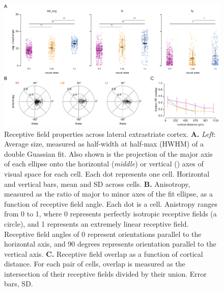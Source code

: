 
\begin{figure}[t!]
    \includegraphics[width=\textwidth]{figures/chapter_3/fig_3-4_rf_aggregate/fig_3-4_rf_aggregate.pdf}
    \vspace{.1in}
    \caption[Receptive field properties]{Receptive field properties across lateral extrastriate cortex. 
    \textbf{A.} \textit{Left}: Average size, measured as half-width at half-max (HWHM) of a double Guassian fit. Also shown is the projection of the major axis of each ellipse onto the horizontal (\textit{middle}) or vertical () axes of visual space for each cell. Each dot represents one cell. Horizontal and vertical bars, mean and SD across cells. 
    \textbf{B.} Anisotropy, measured as the ratio of major to minor axes of the fit ellipse, as a function of receptive field angle. Each dot is a cell. Anistropy ranges from 0 to 1, where 0 represents perfectly isotropic receptive fields (a circle), and 1 represents an extremely linear receptive field. Receptive field angles of 0 represent orientations parallel to the horizontal axis, and 90 degrees represents orientation parallel to the vertical axis.
    \textbf{C.} Receptive field overlap as a function of cortical distance. For each pair of cells, overlap is measured as the intersection of their receptive fields divided by their union. Error bars, SD.  
    \label{fig:rf_examples}}
\end{figure}

